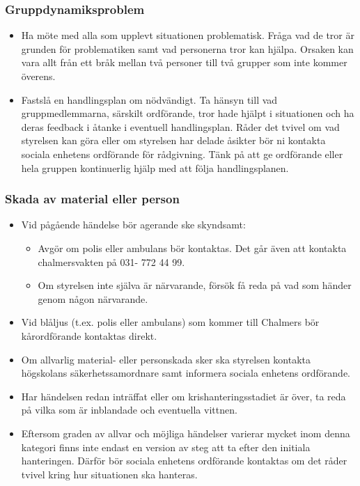\subsubsection{Gruppdynamiksproblem}
\begin{itemize}
    \item Ha möte med alla som upplevt situationen problematisk. Fråga vad de tror är grunden för problematiken samt vad personerna tror kan hjälpa. Orsaken kan vara allt från ett bråk mellan två personer till två grupper som inte kommer överens. 

    \item Fastslå en handlingsplan om nödvändigt. Ta hänsyn till vad gruppmedlemmarna, särskilt ordförande,  tror hade hjälpt i situationen och ha deras feedback i åtanke i eventuell handlingsplan. Råder det tvivel om  vad styrelsen kan göra eller om styrelsen har delade åsikter bör ni kontakta sociala enhetens  ordförande för rådgivning. Tänk på att ge ordförande eller hela gruppen kontinuerlig hjälp med att följa handlingsplanen.
\end{itemize}

\subsubsection{Skada av material eller person}
\begin{itemize}
    \item Vid pågående händelse bör agerande ske skyndsamt: 
    \begin{itemize}
        \item Avgör om polis eller ambulans bör kontaktas. Det går även att kontakta  
        chalmersvakten på 031- 772 44 99.
        \item Om styrelsen inte själva är närvarande, försök få reda på vad som händer genom någon närvarande. 
    \end{itemize}
    \item Vid blåljus (t.ex. polis eller ambulans) som kommer till Chalmers bör kårordförande kontaktas direkt.
    \item Om allvarlig material- eller personskada sker ska styrelsen kontakta högskolans säkerhetssamordnare samt informera sociala enhetens ordförande.
    \item Har händelsen redan inträffat eller om krishanteringsstadiet är över, ta reda på vilka som är inblandade och eventuella vittnen.
    \item Eftersom graden av allvar och möjliga händelser varierar mycket inom denna kategori finns  inte endast en version av steg att ta efter den initiala hanteringen. Därför bör sociala enhetens ordförande kontaktas om det råder tvivel kring hur situationen ska hanteras.
\end{itemize}

